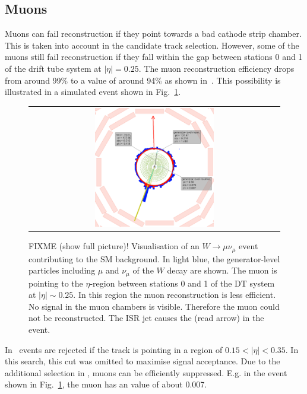 \subsection*{Muons}
Muons can fail reconstruction if they point towards a bad cathode strip chamber.
This is taken into account in the candidate track selection.
However, some of the muons still fail reconstruction if they fall within the gap between stations 0 and 1 of the drift tube system at $|\eta|=0.25$.
The muon reconstruction efficiency drops from around 99\% to a value of around 94\% as shown in~\cite{bib:CMS:DT_Thesis,bib:CMS:DT_8TeV_AN}.
This possibility is illustrated in a simulated event shown in Fig.~\ref{fig:LostMuon}.
\begin{figure}[!tb]
  \centering 
  \begin{tabular}{c}
    \includegraphics[width=0.49\textwidth]{figures/analysis/Background/LostMuon_Lumi_456307_event_182377157.png}
  \end{tabular}
  \caption{FIXME (show full picture)! Visualisation of an $W\rightarrow \mu\nu_{\mu}$ event contributing to the SM background. 
           In light blue, the generator-level particles including $\mu$ and $\nu_{\mu}$ of the $W$ decay are shown. 
           The muon is pointing to the $\eta$-region between stations 0 and 1 of the DT system at $|\eta|\sim0.25$.
           In this region the muon reconstruction is less efficient. No signal in the muon chambers is visible. Therefore the muon could not be reconstructed.
           The ISR jet causes the \met (read arrow) in the event.}
  \label{fig:LostMuon}
\end{figure}


In~\cite{bib:CMS:DT_Thesis,bib:CMS:DT_8TeV_AN} events are rejected if the track is pointing in a region of $0.15<|\eta|<0.35$.
In this search, this cut was omitted to maximise signal acceptance. 
Due to the additional selection in \ias, muons can be efficiently suppressed.
E.g. in the event shown in Fig.~\ref{fig:LostMuon}, the muon has an \ias value of about 0.007.\\

